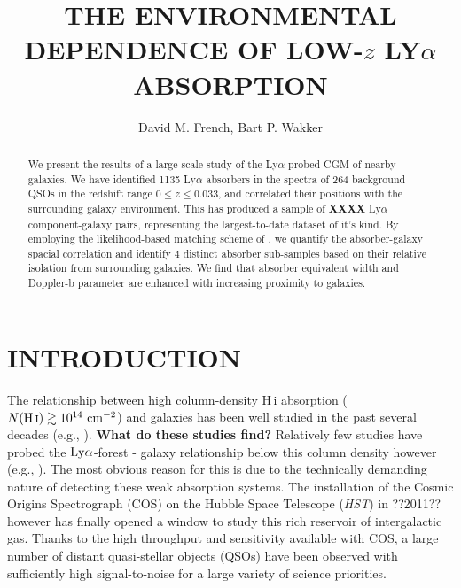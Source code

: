 \documentclass[twocolumn,tighten]{aastex62}
\newcommand{\HI}{\mbox{H\,{\sc i}} }
\begin{document}
\title{THE ENVIRONMENTAL DEPENDENCE OF LOW-$z$ LY$\alpha$ ABSORPTION}



\author{David M. French, Bart P. Wakker}


\begin{abstract}
We present the results of a large-scale study of the Ly$\alpha$-probed CGM of nearby galaxies. We have identified 1135 Ly$\alpha$ absorbers in the spectra of 264 background QSOs in the redshift range $0 \leq z \leq 0.033$, and correlated their positions with the surrounding galaxy environment. This has produced a sample of \textbf{XXXX} Ly$\alpha$ component-galaxy pairs, representing the largest-to-date dataset of it's kind. By employing the likelihood-based matching scheme of \cite{french2017}, we quantify the absorber-galaxy spacial correlation and identify 4 distinct absorber sub-samples based on their relative isolation from surrounding galaxies. We find that absorber equivalent width and Doppler-b parameter are enhanced with increasing proximity to galaxies.

\end{abstract}




\section{INTRODUCTION}

The relationship between high column-density \HI absorption ($N(\HI) \gtrsim 10^{14} ~\rm cm^{-2}$) and galaxies has been well studied in the past several decades (e.g., \citealt{lanzetta1995, bowen1996, chen2003, chen2008, rubin2010, rubin2012, steidel2010, prochaska2011b}). \textbf{What do these studies find?} Relatively few studies have probed the $\rm Ly\alpha$-forest - galaxy relationship below this column density however (e.g., \citealt{wakker2009, french2017, bowen2002}). The most obvious reason for this is due to the technically demanding nature of detecting these weak absorption systems. The installation of the Cosmic Origins Spectrograph (COS) on the Hubble Space Telescope (\emph{HST}) in ??2011?? however has finally opened a window to study this rich reservoir of intergalactic gas.  Thanks to the high throughput and sensitivity available with COS, a large number of distant quasi-stellar objects (QSOs) have been observed with sufficiently high signal-to-noise for a large variety of science priorities. 
\end{document}
